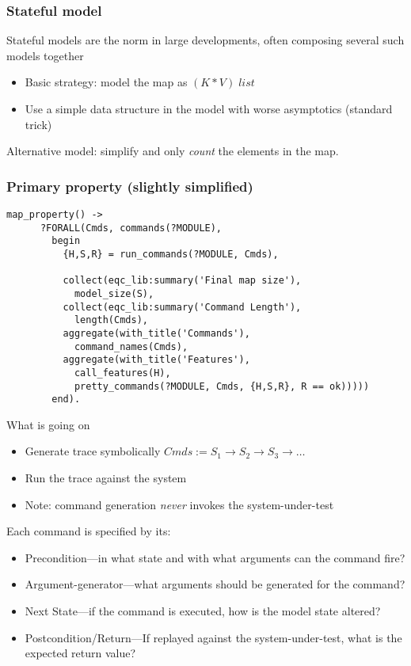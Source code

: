 \documentclass[lualatex]{beamer}
\begin{document}
\begin{frame}[fragile]
\frametitle{Stateful model}

Stateful models are the norm in large developments, often composing several such models together

\begin{itemize}
\item Basic strategy: model the map as $(K * V) \; list$
\item Use a simple data structure in the model with worse asymptotics (standard trick)
\end{itemize}

Alternative model: simplify and only \emph{count} the elements in the map.

\end{frame}

\begin{frame}[fragile]
\frametitle{Primary property (slightly simplified)}
\begin{Verbatim}[fontsize=\small]
map_property() ->
      ?FORALL(Cmds, commands(?MODULE),
        begin
          {H,S,R} = run_commands(?MODULE, Cmds),
          
          collect(eqc_lib:summary('Final map size'),
          	model_size(S),
          collect(eqc_lib:summary('Command Length'),
          	length(Cmds),
          aggregate(with_title('Commands'),
          	command_names(Cmds),
          aggregate(with_title('Features'),
          	call_features(H),
            pretty_commands(?MODULE, Cmds, {H,S,R}, R == ok)))))
        end).
\end{Verbatim}
\end{frame}

\begin{frame}
What is going on
\begin{itemize}
\item Generate trace symbolically $Cmds := S_1 \to S_2 \to S_3 \to …$
\item Run the trace against the system
\item Note: command generation \emph{never} invokes the system-under-test
\end{itemize}
Each command is specified by its:
\begin{itemize}
\item Precondition—in what state and with what arguments can the command fire?
\item Argument-generator—what arguments should be generated for the command?
\item Next State—if the command is executed, how is the model state altered?
\item Postcondition/Return—If replayed against the system-under-test, what is the expected return value?
\end{itemize}
\end{frame}
\end{document}
